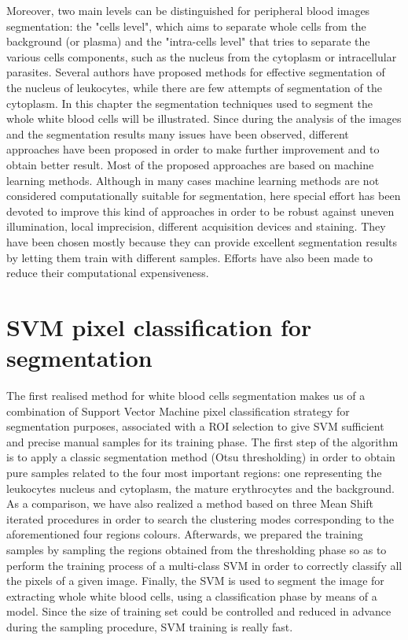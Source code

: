 \documentclass[final,a4paper,12pt,english]{UnicaPhdThesis3}
\begin{document}
Moreover, two main levels can be distinguished for peripheral blood images segmentation: the "cells level", which aims to separate whole cells from the background (or plasma) and the "intra-cells level" that tries to separate the various cells components, such as the nucleus from the cytoplasm or intracellular parasites. Several authors have proposed methods for effective segmentation of the nucleus of leukocytes, while there are few attempts of segmentation of the cytoplasm. In this chapter the segmentation techniques used to segment the whole white blood cells will be illustrated. Since during the analysis of the images and the segmentation results many issues have been observed, different approaches have been proposed in order to make further improvement and to obtain better result. Most of the proposed approaches are based on machine learning methods. Although in many cases machine learning methods are not considered computationally suitable for segmentation, here special effort has been devoted to improve this kind of approaches in order to be robust against uneven illumination, local imprecision, different acquisition devices and staining. They have been chosen mostly because they can provide excellent segmentation results by letting them train with different samples. Efforts have also been made to reduce their computational expensiveness.
  
\section{SVM pixel classification for segmentation} \label{iciap2015} %
The first realised method for white blood cells segmentation makes us of a combination of Support Vector Machine pixel classification strategy for segmentation purposes, associated with a ROI selection to give SVM sufficient and precise manual samples for its training phase. 
The first step of the algorithm is to apply a classic segmentation method (Otsu thresholding) in order to obtain pure samples related to the four most important regions: one representing the leukocytes nucleus and cytoplasm, the mature erythrocytes and the background. As a comparison, we have also realized a method based on three Mean Shift iterated procedures in order to search the clustering modes corresponding to the aforementioned four regions colours. Afterwards, we prepared the training samples by sampling the regions obtained from the thresholding phase so as to perform the training process of a multi-class SVM in order to correctly classify all the pixels of a given image. Finally, the SVM is used to segment the image for extracting whole white blood cells, using a classification phase by means of a model. Since the size of training set could be controlled and reduced in advance during the sampling procedure, SVM training is really fast.
\end{document}
